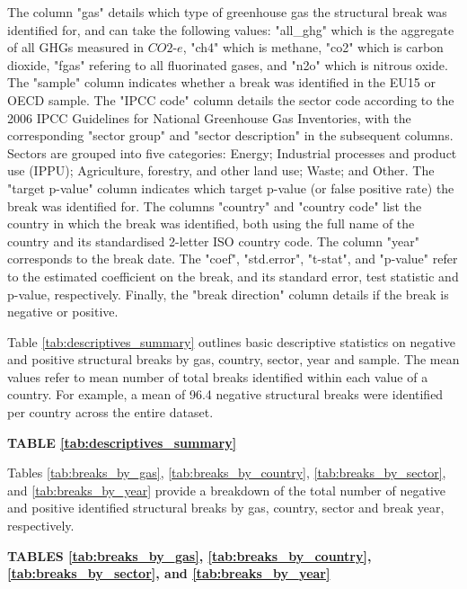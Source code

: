\documentclass[a4paper]{article}
\begin{document}
The column "gas" details which type of greenhouse gas the structural break was identified for, and can take the following values: "all\_ghg" which is the aggregate of all GHGs measured in $CO2$-$e$, "ch4" which is methane, "co2" which is carbon dioxide, "fgas" refering to all fluorinated gases, and "n2o" which is nitrous oxide. The "sample" column indicates whether a break was identified in the EU15 or OECD sample. The "IPCC code" column details the sector code according to the 2006 IPCC Guidelines for National Greenhouse Gas Inventories, with the corresponding "sector group" and "sector description" in the subsequent columns. Sectors are grouped into five categories: Energy; Industrial processes and product use (IPPU); Agriculture, forestry, and other land use; Waste; and Other. The "target p-value" column indicates which target p-value (or false positive rate) the break was identified for. The columns "country" and "country code" list the country in which the break was identified, both using the full name of the country and its standardised 2-letter ISO country code. The column "year" corresponds to the break date. The "coef", "std.error", "t-stat", and "p-value" refer to the estimated coefficient on the break, and its standard error, test statistic and p-value, respectively. Finally, the "break direction" column details if the break is negative or positive.

Table \ref{tab:descriptives_summary} outlines basic descriptive statistics on negative and positive structural breaks by gas, country, sector, year and sample. The mean values refer to mean number of total breaks identified within each value of a country. For example, a mean of 96.4 negative structural breaks were identified per country across the entire dataset.

\bigskip
\begin{center}
    \textbf{TABLE \ref{tab:descriptives_summary}}
\end{center}

Tables \ref{tab:breaks_by_gas}, \ref{tab:breaks_by_country}, \ref{tab:breaks_by_sector}, and \ref{tab:breaks_by_year} provide a breakdown of the total number of negative and positive identified structural breaks by gas, country, sector and break year, respectively.

\bigskip
\begin{center}
    \textbf{TABLES \ref{tab:breaks_by_gas}, \ref{tab:breaks_by_country}, \ref{tab:breaks_by_sector}, and \ref{tab:breaks_by_year}}
\end{center}
\end{document}
